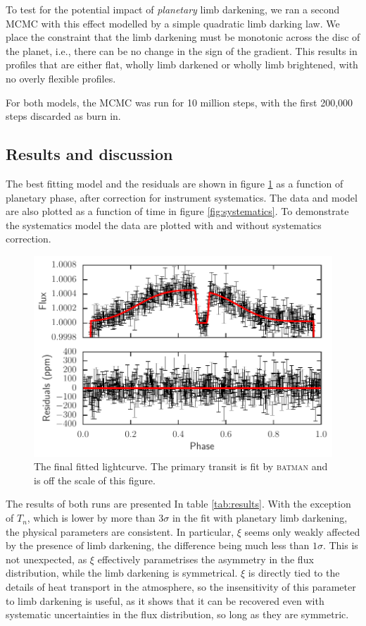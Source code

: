 \documentclass[a4paper,fleqn,usenatbib]{mnras}
\begin{document}
To test for the potential impact of \emph{planetary} limb darkening, we ran a second MCMC with this effect modelled by a simple quadratic limb darking law. We place the constraint that the limb darkening must be monotonic across the disc of the planet, i.e., there can be no change in the sign of the gradient. This results in profiles that are either flat, wholly limb darkened or wholly limb brightened, with no overly flexible profiles.

For both models, the MCMC was run for 10 million steps, with the first 200,000 steps discarded as burn in.

\subsection{Results and discussion}\label{sec:results}

The best fitting model and the residuals are shown in figure \ref{fig:phase folded} as a function of planetary phase, after correction for instrument systematics. The data and model are also plotted as a function of time in figure \ref{fig:systematics}. To demonstrate the systematics model the data are plotted with and without systematics correction.

\begin{figure}
\begin{center}
\includegraphics[width=\columnwidth]{img/new_lc.pdf}
\caption{The final fitted lightcurve. The primary transit is fit by \textsc{batman} and is off the scale of this figure.}
\label{fig:phase folded}
\end{center}
\end{figure}

The results of both runs are presented In table \ref{tab:results}. With the exception of $T_n$, which is lower by more than $3\sigma$ in the fit with planetary limb darkening, the physical parameters are consistent. In particular, $\xi$ seems only weakly affected by the presence of limb darkening, the difference being much less than $1\sigma$. This is not unexpected, as $\xi$ effectively parametrises the asymmetry in the flux distribution, while the limb darkening is symmetrical. $\xi$ is directly tied to the details of heat transport in the atmosphere, so the insensitivity of this parameter to limb darkening is useful, as it shows that it can be recovered even with systematic uncertainties in the flux distribution, so long as they are symmetric.
\end{document}
